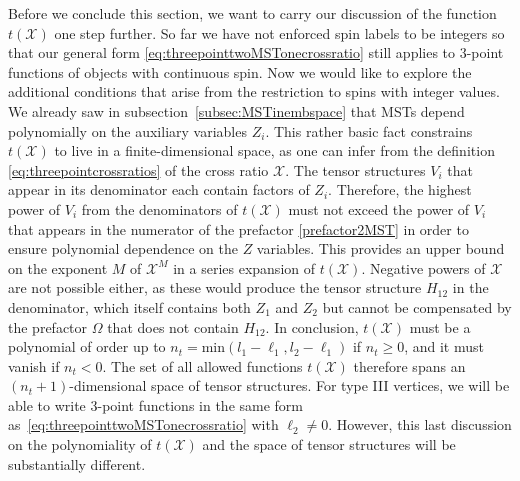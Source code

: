 \documentclass{article}
\begin{document}
Before we conclude this section, we want to carry our discussion of the function $t(\mathcal{X})$
one step further. So far we have not enforced spin labels to be integers so that our general form \eqref{eq:threepointtwoMSTonecrossratio} still applies to 3-point functions of objects with continuous spin. Now we would like to explore the additional conditions that arise from the 
restriction to spins with integer values. We already saw in subsection~\ref{subsec:MSTinembspace} 
that MSTs depend polynomially on the auxiliary variables $Z_i$. This rather basic fact constrains $t(\mathcal{X})$ to live in a finite-dimensional space, as one can infer from the definition \eqref{eq:threepointcrossratios} of the cross ratio $\mathcal{X}$. The tensor structures $V_i$ 
that appear in its denominator each contain factors of $Z_i$. Therefore, the highest power of $V_i$ from 
the denominators of $t(\mathcal{X})$ must not exceed the power of $V_i$ that appears in the numerator 
of the prefactor \eqref{prefactor2MST} in order to ensure polynomial dependence on the $Z$ variables.
This provides an upper bound on the exponent $M$ of $\mathcal{X}^M$ in a series expansion 
of $t(\mathcal{X})$. Negative powers of $\mathcal{X}$ are not possible either, as these would produce 
the tensor structure $H_{12}$ in the denominator, which itself contains both $Z_1$ and $Z_2$
but cannot be compensated by the prefactor $\Omega$ that does not contain $H_{12}$. In conclusion, 
$t(\mathcal{X})$ must be a polynomial of order up to $n_t=\text{min}(l_1-\ell_1,
l_2-\ell_1)$ if $n_t\ge 0$, and it must vanish if $n_t<0$. The set of all allowed functions $t(\mathcal{X})$ therefore spans an $(n_t+1)$-dimensional space of tensor structures. For type III vertices, we will be able to write 3-point functions in the same form as~\eqref{eq:threepointtwoMSTonecrossratio} with $\ell_2\ne 0$. However, this last discussion on the polynomiality of $t(\mathcal{X})$ and the space of tensor structures will be substantially different.
\end{document}

